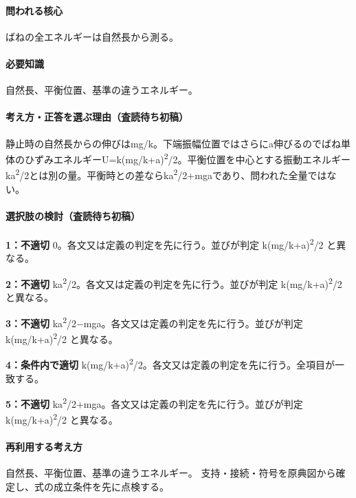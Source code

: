 \paragraph{問われる核心} ばねの全エネルギーは自然長から測る。

\paragraph{必要知識} 自然長、平衡位置、基準の違うエネルギー。

\paragraph{考え方・正答を選ぶ理由（査読待ち初稿）} 静止時の自然長からの伸びはmg/k。下端振幅位置ではさらにa伸びるのでばね単体のひずみエネルギーU=\allowbreak{}k(mg/k+a)\textsuperscript{2}/2。平衡位置を中心とする振動エネルギーka\textsuperscript{2}/2とは別の量。平衡時との差ならka\textsuperscript{2}/2+mgaであり、問われた全量ではない。

\paragraph{選択肢の検討（査読待ち初稿）}\mbox{}\par

\noindent\textbf{1：不適切} 0。各文又は定義の判定を先に行う。並びが判定 k(mg/k+a)\textsuperscript{2}/2 と異なる。\par

\noindent\textbf{2：不適切} ka\textsuperscript{2}/2。各文又は定義の判定を先に行う。並びが判定 k(mg/k+a)\textsuperscript{2}/2 と異なる。\par

\noindent\textbf{3：不適切} ka\textsuperscript{2}/2−mga。各文又は定義の判定を先に行う。並びが判定 k(mg/k+a)\textsuperscript{2}/2 と異なる。\par

\noindent\textbf{4：条件内で適切} k(mg/k+a)\textsuperscript{2}/2。各文又は定義の判定を先に行う。全項目が一致する。\par

\noindent\textbf{5：不適切} ka\textsuperscript{2}/2+mga。各文又は定義の判定を先に行う。並びが判定 k(mg/k+a)\textsuperscript{2}/2 と異なる。\par

\paragraph{再利用する考え方} 自然長、平衡位置、基準の違うエネルギー。 支持・接続・符号を原典図から確定し、式の成立条件を先に点検する。

